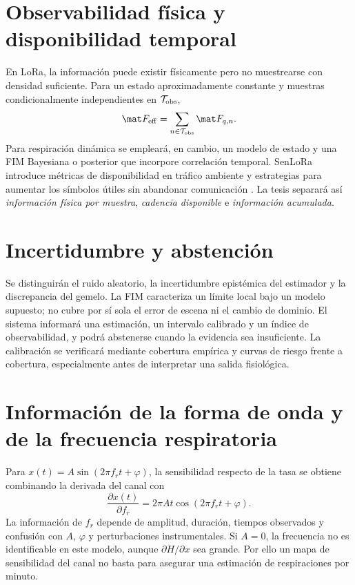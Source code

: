 \section{Observabilidad física y disponibilidad temporal}

En LoRa, la información puede existir físicamente pero no muestrearse con densidad suficiente. Para un estado aproximadamente constante y muestras condicionalmente independientes en $\mathcal T_{\rm obs}$,
\begin{equation}
\mat F_{\rm eff}=
\sum_{n\in\mathcal T_{\rm obs}}\mat F_{q,n}.
\end{equation}
Para respiración dinámica se empleará, en cambio, un modelo de estado y una FIM Bayesiana o posterior que incorpore correlación temporal. SenLoRa introduce métricas de disponibilidad en tráfico ambiente y estrategias para aumentar los símbolos útiles sin abandonar comunicación \citep{SenLoRa2025}. La tesis separará así \emph{información física por muestra}, \emph{cadencia disponible} e \emph{información acumulada}.

\section{Incertidumbre y abstención}

Se distinguirán el ruido aleatorio, la incertidumbre epistémica del estimador y la discrepancia del gemelo. La FIM caracteriza un límite local bajo un modelo supuesto; no cubre por sí sola el error de escena ni el cambio de dominio. El sistema informará una estimación, un intervalo calibrado y un índice de observabilidad, y podrá abstenerse cuando la evidencia sea insuficiente. La calibración se verificará mediante cobertura empírica y curvas de riesgo frente a cobertura, especialmente antes de interpretar una salida fisiológica.

\section{Información de la forma de onda y de la frecuencia respiratoria}

Para $x(t)=A\sin(2\pi f_rt+\varphi)$, la sensibilidad respecto de la tasa se
obtiene combinando la derivada del canal con
\begin{equation}
\frac{\partial x(t)}{\partial f_r}=2\pi At\cos(2\pi f_rt+\varphi).
\end{equation}
La información de $f_r$ depende de amplitud, duración, tiempos observados y
confusión con $A$, $\varphi$ y perturbaciones instrumentales. Si $A=0$, la
frecuencia no es identificable en este modelo, aunque $\partial H/\partial x$
sea grande. Por ello un mapa de sensibilidad del canal no basta para asegurar
una estimación de respiraciones por minuto.

